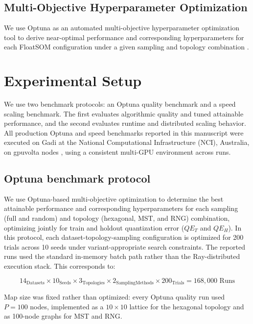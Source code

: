 \documentclass[10pt]{article} %
\begin{document}
\subsection{Multi-Objective Hyperparameter Optimization}

We use Optuna as an automated multi-objective hyperparameter optimization tool to derive near-optimal performance and corresponding hyperparameters for each FloatSOM configuration under a given sampling and topology combination \citep{akibaOptunaNextgenerationHyperparameter2019}.

\section{Experimental Setup}

We use two benchmark protocols: an Optuna quality benchmark and a speed scaling benchmark. The first evaluates algorithmic quality and tuned attainable performance, and the second evaluates runtime and distributed scaling behavior. All production Optuna and speed benchmarks reported in this manuscript were executed on Gadi at the National Computational Infrastructure (NCI), Australia, on gpuvolta nodes \citep{HPCSystemsNCI}, using a consistent multi-GPU environment across runs.

\subsection{Optuna benchmark protocol}

We use Optuna-based multi-objective optimization to determine the best attainable performance and corresponding hyperparameters for each sampling (full and random) and topology (hexagonal, MST, and RNG) combination, optimizing jointly for train and holdout quantization error ($QE_T$ and $QE_H$). In this protocol, each dataset-topology-sampling configuration is optimized for 200 trials across 10 seeds under variant-appropriate search constraints. The reported runs used the standard in-memory batch path rather than the Ray-distributed execution stack. This corresponds to:

\begin{equation*}
14_{\text{Datasets}} \times 10_{\text{Seeds}} \times 3_{\text{Topologies}} \times 2_{\text{SamplingMethods}} \times 200_{\text{Trials}}= 168{,}000 \text{ Runs}
\end{equation*}

Map size was fixed rather than optimized: every Optuna quality run used $P=100$ nodes, implemented as a $10\times10$ lattice for the hexagonal topology and as 100-node graphs for MST and RNG.
\end{document}

